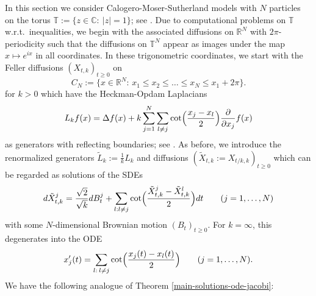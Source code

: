 \documentclass[reqno]{amsart}
\theoremstyle{plain}
\theoremstyle{definition}
\numberwithin{equation}{section}
\begin{document}
In this section we consider  Calogero-Moser-Sutherland models
with $N$  particles on the torus $\mathbb T:=\{z\in\mathbb C:\> |z|=1\}$; see \cite{LV}.
Due to computational problems on $\mathbb T$ w.r.t.~inequalities, we 
 begin with the associated diffusions 
 on  $\mathbb R^N$ with  $2\pi$-periodicity  such that the diffusions on $\mathbb T^N$ appear as
 images under the map $x \mapsto e^{ix}$ in all coordinates.
 In these trigonometric coordinates, we  start with the  Feller diffusions $(X_{t,k})_{t\ge0}$ on
 \begin{equation}\label{trig-torus-state-space}
   C_N := \{x\in \mathbb R^N: \, x_1\le x_2\le\ldots\le x_N\le x_1+2\pi\}.
 \end{equation}
for $k>0$
 which have the Heckman-Opdam Laplacians
  \begin{equation}
     L_kf(x)= \Delta f(x)+ k\sum_{j=1}^N \sum_{l\ne j}
    \cot\Bigl(\frac{x_j-x_l}{2}\Bigr)\frac{\partial}{\partial x_j}f(x)
   \end{equation}
 as generators  with reflecting boundaries; see  \cite{RR, RV2}.
 As before, we introduce the renormalized generators
 $\tilde L_k:=\frac{1}{k}  L_k$ and diffusions $(\tilde X_{t,k}:= X_{t/k,k})_{t\ge0}$
 which can be regarded as solutions of
the SDEs
     \begin{equation}\label{sde-torus-R}
       d\tilde X_{t,k}^j=\frac{\sqrt 2}{\sqrt k}dB_{t}^j+\sum_{l: l\ne j} \cot\Bigl(\frac{\tilde X_{t,k}^j-\tilde X_{t,k}^l}{2}\Bigr)dt
       \quad\quad(j=1,\ldots,N)
     \end{equation}
     with some $N$-dimensional Brownian motion $(B_{t})_{t\ge0}$. For $k=\infty$, this degenerates into the ODE
\begin{equation}\label{ODE-torus-R}
    x_j^\prime(t)= \sum_{l: \> l\ne j}\cot\Bigl(\frac{x_j(t)-x_l(t)}{2}\Bigr) \quad\quad(j=1,\ldots,N).
    \end{equation}
We have the following analogue of Theorem \ref{main-solutions-ode-jacobi}:
\end{document}
